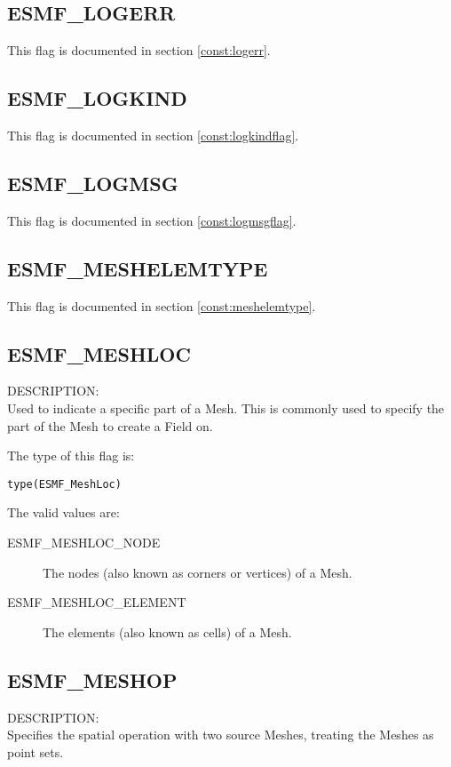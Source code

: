 \subsection{ESMF\_LOGERR}
This flag is documented in section \ref{const:logerr}.

\subsection{ESMF\_LOGKIND}
This flag is documented in section \ref{const:logkindflag}.

\subsection{ESMF\_LOGMSG}
This flag is documented in section \ref{const:logmsgflag}.

\subsection{ESMF\_MESHELEMTYPE}
This flag is documented in section \ref{const:meshelemtype}.

\subsection{ESMF\_MESHLOC}
\label{const:meshloc}
{\sf DESCRIPTION:\\}  
Used to indicate a specific part of a Mesh. This is commonly used to specify the part of the Mesh to
create a Field on. 

The type of this flag is:

{\tt type(ESMF\_MeshLoc)}

The valid values are:
\begin{description}

\item [ESMF\_MESHLOC\_NODE]
         The nodes (also known as corners or vertices) of a Mesh. 

\item [ESMF\_MESHLOC\_ELEMENT]
         The elements (also known as cells) of a Mesh. 
\end{description}


\subsection{ESMF\_MESHOP}
\label{const:meshop}
{\sf DESCRIPTION:\\}  
 Specifies the spatial operation with two source Meshes, treating the Meshes as point sets.

